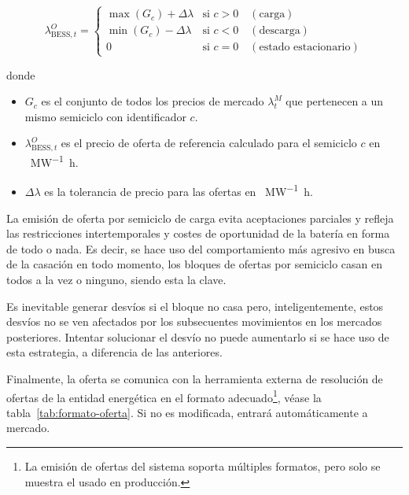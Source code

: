 \begin{samepage}

  \begin{equation}
    \lambda^{O}_{\text{BESS}, t} =
    \begin{cases}
      \max(G_{c}) + \Delta \lambda & \text{si } c > 0 \quad (\text{carga})\\
      \min(G_{c}) - \Delta \lambda & \text{si } c < 0 \quad (\text{descarga})\\
      0                            & \text{si } c = 0 \quad (\text{estado estacionario})
    \end{cases}
  \end{equation}

  donde

  \begin{itemize}

    \item \( G_{c} \) es el conjunto de todos los precios de mercado \( \lambda^{M}_{t} \) que pertenecen a un mismo semiciclo con identificador \( c \).

    \item \( \lambda^{O}_{\text{BESS}, t} \) es el precio de oferta de referencia calculado para el semiciclo \( c \) en \si{\text{\euro}\per\mega\watt\hour}.

    \item \( \Delta \lambda \) es la tolerancia de precio para las ofertas en \si{\text{\euro}\per\mega\watt\hour}.

  \end{itemize}

\end{samepage}

La emisión de oferta por semiciclo de carga evita aceptaciones parciales y refleja las restricciones intertemporales y costes de oportunidad de la batería en forma de todo o nada. Es decir, se hace uso del comportamiento más agresivo en busca de la casación en todo momento, los bloques de ofertas por semiciclo casan en todos a la vez o ninguno, siendo esta la clave.

Es inevitable generar desvíos si el bloque no casa pero, inteligentemente, estos desvíos no se ven afectados por los subsecuentes movimientos en los mercados posteriores. Intentar solucionar el desvío no puede aumentarlo si se hace uso de esta estrategia, a diferencia de las anteriores.

Finalmente, la oferta se comunica con la herramienta externa de resolución de ofertas de la entidad energética en el formato adecuado\footnote{La emisión de ofertas del sistema soporta múltiples formatos, pero solo se muestra el usado en producción.}, véase la tabla~\ref{tab:formato-oferta}. Si no es modificada, entrará automáticamente a mercado.

